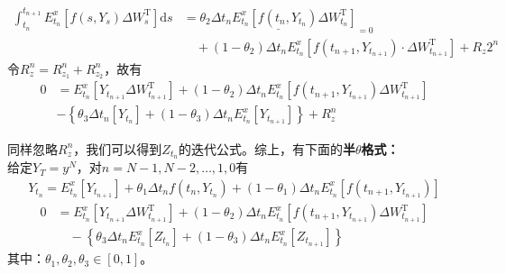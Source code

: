 			\begin{align*}
			\int_{t_n} ^{t_{n + 1}}E_{t_n}^x [f(s,Y_s)\Delta W_s^{\mathrm{T}}]\mathrm{d}s &= \underline {\theta_2\Delta t_nE_{t_n}^x[f(t_n,Y_{t_n})\Delta W_{t_n}^{\mathrm{T}}]}_{ = 0}\\
			&\quad + (1-\theta_2) \Delta t_nE_{t_n}^x[f(t_{n+1},Y_{t_{n+1}})\cdot \Delta W_{t_{n+1}}^{\mathrm{T}}] + R_z2^n
			\end{align*}
			令$R_z^n=R_{z_1}^n+R_{z_2}^n$，故有
					\begin{equation*}
					\begin{split}
					0 &= E_{{t_n}}^x\left[ {{Y_{{t_{n + 1}}}}  \Delta W_{{t_{n + 1}}}^\mathrm{T}} \right] + \left( {1 - {\theta _2}} \right)\Delta {t_n}E_{{t_n}}^x\left[ {f\left( {{t_{n + 1}},{Y_{{t_{n + 1}}}}} \right)\Delta W_{{t_{n + 1}}}^\mathrm{T}} \right]\\
					& - \left\{ {{\theta _3}\Delta {t_n}\left[ {{Y_{{t_n}}}} \right] + \left( {1 - {\theta _3}} \right)\Delta {t_n}E_{{t_n}}^x\left[ {{Y_{{t_{n + 1}}}}} \right]} \right\} + R_z^n
					\end{split}
					\end{equation*}
			\par
			同样忽略$R_z^n$，我们可以得到$Z_{t_n}$的迭代公式。综上，有下面的\textbf{半$\theta$格式：}\\
			给定$Y_T=y^N$，对$n=N-1,N-2,\ldots,1,0$有
			\begin{align*}
			{Y_{{t_n}}} = E_{{t_n}}^x\left[ {{Y_{{t_{n + 1}}}}} \right] + {\theta _1}\Delta {t_n}f\left( {{t_n},{Y_{{t_n}}}} \right) + \left( {1 - {\theta _1}} \right)\Delta {t_n}E_{{t_n}}^x\left[ {f\left( {{t_{n + 1}},{Y_{{t_{n + 1}}}}} \right)} \right]\end{align*}
					\begin{equation*}
					\begin{split}
					0 &= E_{{t_n}}^x\left[ {{Y_{{t_{n + 1}}}} \Delta W_{{t_{n + 1}}}^\mathrm{T}} \right] + \left( {1 - {\theta _2}} \right)\Delta {t_n}E_{{t_n}}^x\left[ {f\left( {{t_{n + 1}},{Y_{{t_{n + 1}}}}} \right)\Delta W_{{t_{n + 1}}}^\mathrm{T}} \right] \\
			 		&\quad - \left\{ {{\theta _3}\Delta {t_n}E_{{t_n}}^x\left[ {{Z_{{t_n}}}} \right] + \left( {1 - {\theta _3}} \right)\Delta {t_n}E_{{t_n}}^x\left[ {{Z_{{t_{n + 1}}}}} \right]} \right\}
					\end{split}
					\end{equation*}
			其中：${\theta _1},{\theta _2},{\theta _3} \in [0,1]$。
